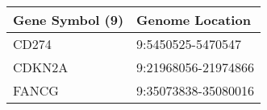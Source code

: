 \begin{tabular}{ll}
\toprule
Gene Symbol (9) &     Genome Location \\
\midrule
          CD274 &   9:5450525-5470547 \\
         CDKN2A & 9:21968056-21974866 \\
          FANCG & 9:35073838-35080016 \\
\bottomrule
\end{tabular}

